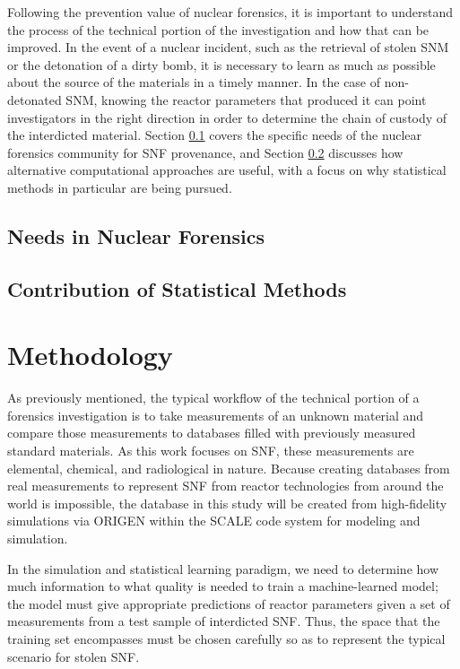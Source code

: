 Following the prevention value of nuclear forensics, it is important to
understand the process of the technical portion of the investigation and how
that can be improved.  In the event of a nuclear incident, such as the
retrieval of stolen \gls{SNM} or the detonation of a dirty bomb, it is
necessary to learn as much as possible about the source of the materials in a
timely manner. In the case of non-detonated \gls{SNM}, knowing the reactor
parameters that produced it can point investigators in the right direction in
order to determine the chain of custody of the interdicted material.  Section
\ref{sec:nfneeds} covers the specific needs of the nuclear forensics community
for \gls{SNF} provenance, and Section \ref{sec:statscontrib} discusses how
alternative computational approaches are useful, with a focus on why
statistical methods in particular are being pursued. 

\subsection{Needs in Nuclear Forensics}

\label{sec:nfneeds}

\subsection{Contribution of Statistical Methods}

\label{sec:statscontrib}

\section{Methodology}
\label{sec:methodology}

As previously mentioned, the typical workflow of the technical portion of a
forensics investigation is to take measurements of an unknown material and
compare those measurements to databases filled with previously measured
standard materials. As this work focuses on \gls{SNF}, these measurements are
elemental, chemical, and radiological in nature.  Because creating databases
from real measurements to represent \gls{SNF} from reactor technologies from
around the world is impossible, the database in this study will be created from
high-fidelity simulations via \gls{ORIGEN} \cite{origen} within the SCALE code
system \cite{scale} for modeling and simulation. 

In the simulation and statistical learning paradigm, we need to determine how
much information to what quality is needed to train a machine-learned model;
the model must give appropriate predictions of reactor parameters given a set
of measurements from a test sample of interdicted \gls{SNF}. Thus, the space 
that the training set encompasses must be chosen carefully so as to represent 
the typical scenario for stolen \gls{SNF}.

